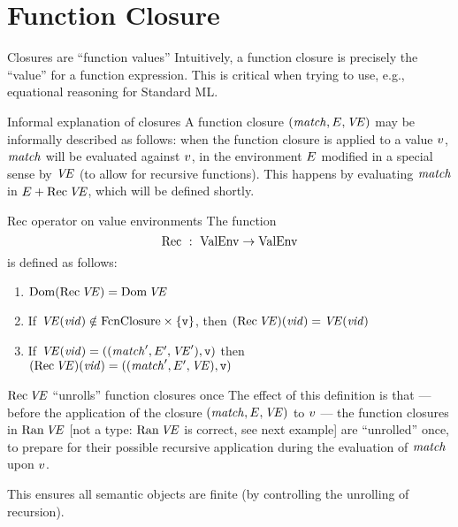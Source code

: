 \section{Function Closure}

\begin{remark}{Closures are ``function values''}
Intuitively, a function closure is precisely the ``value'' for a
function expression. This is critical when trying to use, e.g.,
equational reasoning for Standard ML.
\end{remark}

\begin{clause}{Informal explanation of closures}
A function closure $(\textit{match\/},E,\textit{V\kern-.05emE\/})$ may be informally described as follows:
when the function closure is applied to a value $v$, $\textit{match\/}$ will be
evaluated against $v$, in the environment $E$ modified in a special
sense by $\textit{V\kern-.05emE\/}$ (to allow for recursive functions). This happens by
evaluating $\textit{match\/}$ in $E + \mathop{\rm Rec}\nolimits\textit{V\kern-.05emE\/}$, which will be defined shortly.
\end{clause}

\begin{definition}{Rec operator on value environments}
The function
\begin{equation*}
\mathop{\rm Rec}\nolimits\ :\ {\rm ValEnv}\to{\rm ValEnv}
\end{equation*}
is defined as follows:
\begin{enumerate}
\item $\mathop{\rm Dom}\nolimits(\mathop{\rm Rec}\nolimits\textit{V\kern-.05emE\/})=\mathop{\rm Dom}\nolimits\textit{V\kern-.05emE\/} $
\item If $\textit{V\kern-.05emE\/}(\textit{vid\/})\notin{\rm FcnClosure}\times\{\hbox{\tt v}\}$,
      then $(\mathop{\rm Rec}\nolimits\textit{V\kern-.05emE\/})(\textit{vid\/})=\textit{V\kern-.05emE\/}(\textit{vid\/})$
\item If $\textit{V\kern-.05emE\/}(\textit{vid\/})=((\textit{match\/}',E',\textit{V\kern-.05emE\/}'), \hbox{\tt v})$
      then $(\mathop{\rm Rec}\nolimits\textit{V\kern-.05emE\/})(\textit{vid\/})=((\textit{match\/}',E',\textit{V\kern-.05emE\/}), \hbox{\tt v})$
\end{enumerate}
\end{definition}

\begin{remark}{$\mathop{\rm Rec}\nolimits\textit{V\kern-.05emE\/}$ ``unrolls'' function closures once}
The effect of this definition is that --- before the application of the
closure $(\textit{match\/},E,\textit{V\kern-.05emE\/})$ to $v$ --- the function closures in $\mathop{\rm Ran}\nolimits\textit{V\kern-.05emE\/}$
[not a type: $\mathop{\rm Ran}\nolimits\textit{V\kern-.05emE\/}$ is correct, see next example]
are ``unrolled'' once, to prepare for their possible recursive
application during the evaluation of $\textit{match\/}$ upon $v$.

This ensures all semantic objects are finite (by controlling the
unrolling of recursion).
\end{remark}

